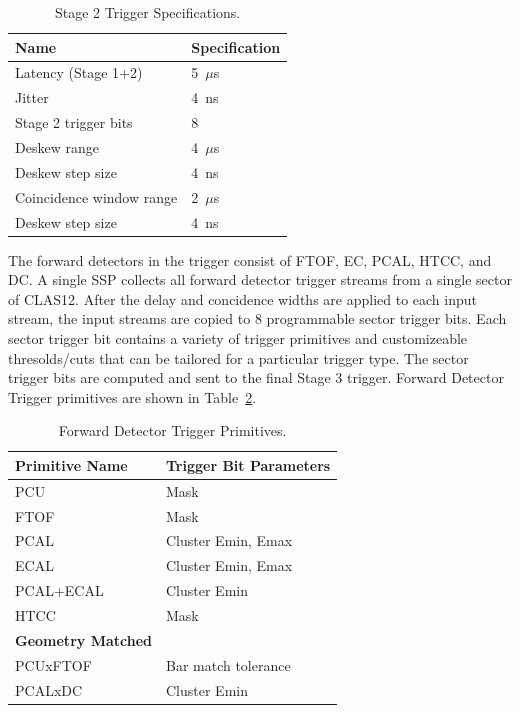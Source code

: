 \begin{table}
\begin{center}
	\begin{tabular}{| l | l |}
		\hline \hline
		Name				& Specification	\\
		\hline
		Latency (Stage 1+2)		& 5~$\mu$s	\\
		Jitter				& 4~ns		\\
		Stage 2 trigger bits		& 8		\\
		Deskew range			& 4~$\mu$s	\\
		Deskew step size		& 4~ns	\\
		Coincidence window range	& 2~$\mu$s	\\
		Deskew step size		& 4~ns	\\
		\hline \hline
	\end{tabular}
\end{center}
\caption{Stage 2 Trigger Specifications.}
\label{tab:stage_2_specs}
\end{table}

The forward detectors in the trigger consist of FTOF, EC, PCAL, HTCC, and DC. A single SSP collects all forward detector trigger streams from a single sector of CLAS12. After the delay and concidence widths are applied to each input stream, the input streams are copied to 8 programmable sector trigger bits. Each sector trigger bit contains a variety of trigger primitives and customizeable thresolds/cuts that can be tailored for a particular trigger type. The sector trigger bits are computed and sent to the final Stage 3 trigger. Forward Detector Trigger primitives are shown in Table~\ref{tab:fd_trig_primitives}.

\begin{table}
\begin{center}
	\begin{tabular}{| l | l |}
		\hline \hline
		Primitive Name			& Trigger Bit Parameters	\\
		\hline
		PCU     			& Mask				\\
		FTOF    			& Mask				\\
		PCAL				& Cluster Emin, Emax		\\
		ECAL				& Cluster Emin, Emax		\\
		PCAL+ECAL			& Cluster Emin			\\
		HTCC				& Mask				\\
		{\bf Geometry Matched}		&				\\
		PCUxFTOF			& Bar match tolerance		\\
		PCALxDC				& Cluster Emin			\\
		\hline \hline
	\end{tabular}
\end{center}
\caption{Forward Detector Trigger Primitives.}
\label{tab:fd_trig_primitives}
\end{table}

